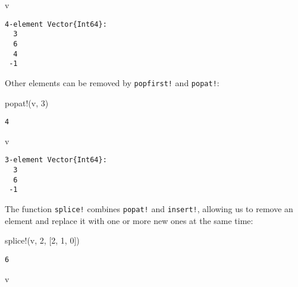 \documentclass[
  letterpaper,
  DIV=11,
  numbers=noendperiod]{scrreprt}
\newenvironment{Shaded}{\begin{snugshade}}{\end{snugshade}}
\newcommand{\FloatTok}[1]{\textcolor[rgb]{0.68,0.00,0.00}{#1}}
\newcommand{\FunctionTok}[1]{\textcolor[rgb]{0.28,0.35,0.67}{#1}}
\newcommand{\NormalTok}[1]{\textcolor[rgb]{0.00,0.23,0.31}{#1}}
\begin{document}
\begin{Shaded}
\begin{Highlighting}[]
\NormalTok{v}
\end{Highlighting}
\end{Shaded}

\begin{verbatim}
4-element Vector{Int64}:
  3
  6
  4
 -1
\end{verbatim}

Other elements can be removed by \texttt{popfirst!} and \texttt{popat!}:

\begin{Shaded}
\begin{Highlighting}[]
\FunctionTok{popat!}\NormalTok{(v, }\FloatTok{3}\NormalTok{)}
\end{Highlighting}
\end{Shaded}

\begin{verbatim}
4
\end{verbatim}

\begin{Shaded}
\begin{Highlighting}[]
\NormalTok{v}
\end{Highlighting}
\end{Shaded}

\begin{verbatim}
3-element Vector{Int64}:
  3
  6
 -1
\end{verbatim}

The function \texttt{splice!} combines \texttt{popat!} and
\texttt{insert!}, allowing us to remove an element and replace it with
one or more new ones at the same time:

\begin{Shaded}
\begin{Highlighting}[]
\FunctionTok{splice!}\NormalTok{(v, }\FloatTok{2}\NormalTok{, [}\FloatTok{2}\NormalTok{, }\FloatTok{1}\NormalTok{, }\FloatTok{0}\NormalTok{])}
\end{Highlighting}
\end{Shaded}

\begin{verbatim}
6
\end{verbatim}

\begin{Shaded}
\begin{Highlighting}[]
\NormalTok{v}
\end{Highlighting}
\end{Shaded}
\end{document}
